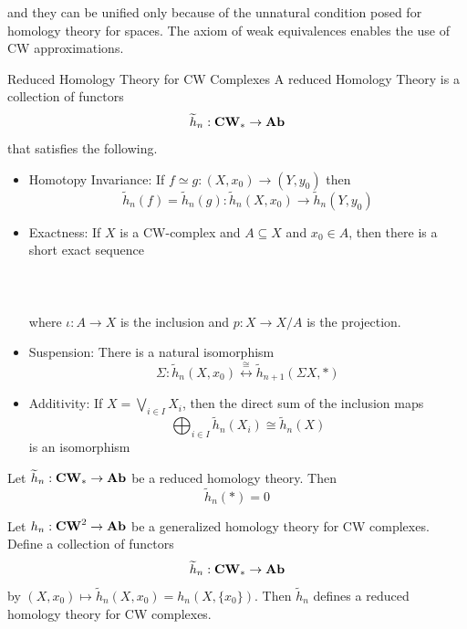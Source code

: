 \documentclass[a4paper]{article}
\begin{document}
and they can be unified only because of the unnatural condition posed for homology theory for spaces. The axiom of weak equivalences enables the use of CW approximations. 

\begin{defn}{Reduced Homology Theory for CW Complexes}{} A reduced Homology Theory is a collection of functors $$\widetilde{h}_n:\bold{CW}_\ast\to\bold{Ab}$$ that satisfies the following. 
\begin{itemize}
\item Homotopy Invariance: If $f\simeq g:(X,x_0)\to(Y,y_0)$ then $$\widetilde{h}_n(f)=\widetilde{h}_n(g):\widetilde{h}_n(X,x_0)\to\widetilde{h}_n(Y,y_0)$$
\item Exactness: If $X$ is a CW-complex and $A\subseteq X$ and $x_0\in A$, then there is a short exact sequence \\~\\
\\~\\
where $\iota:A\to X$ is the inclusion and $p:X\to X/A$ is the projection. 

\item Suspension: There is a natural isomorphism $$\Sigma:\widetilde{h}_n(X,x_0)\overset{\cong}{\longleftrightarrow}\widetilde{h}_{n+1}(\Sigma X,\ast)$$

\item Additivity: If $X=\bigvee_{i\in I}X_i$, then the direct sum of the inclusion maps $$\bigoplus_{i\in I}\widetilde{h}_n(X_i)\cong\widetilde{h}_n(X)$$ is an isomorphism
\end{itemize}
\end{defn}

\begin{lmm}{}{} Let $\widetilde{h}_n:\bold{CW}_\ast\to\bold{Ab}$ be a reduced homology theory. Then $$\widetilde{h}_n(\ast)=0$$
\end{lmm}

\begin{thm}{}{} Let $h_n:\bold{CW}^2\to\bold{Ab}$ be a generalized homology theory for CW complexes. Define a collection of functors $$\widetilde{h}_n:\bold{CW}_\ast\to\bold{Ab}$$ by $(X,x_0)\mapsto\widetilde{h}_n(X,x_0)=h_n(X,\{x_0\})$. Then  $\widetilde{h}_n$ defines a reduced homology theory for CW complexes. 
\end{thm}
\end{document}
